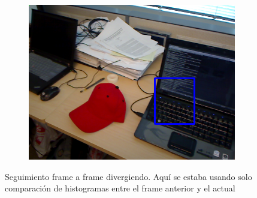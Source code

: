 \begin{figure}
\begin{subfigure}[b]{0.3\textwidth}
		\includegraphics[width=\textwidth]{img/seguimiento_solo_frame/solo_frame-desk_1-coffee_mug_5-frame_34.png}
	\end{subfigure}
	
	\caption{Seguimiento frame a frame divergiendo. Aquí se estaba usando solo comparación de histogramas entre el frame anterior y el actual}
	\label{frame_only_tracking}
\end{figure}


